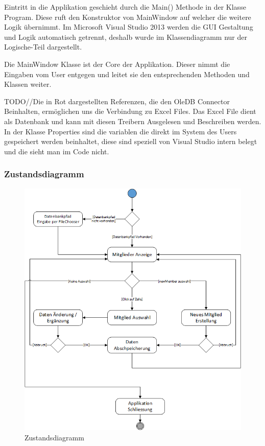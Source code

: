 \documentclass{article}
\begin{document}
Eintritt in die Applikation geschieht durch die Main() Methode in der Klasse Program. Diese ruft den Konstruktor von MainWindow auf welcher die weitere Logik übernimmt. Im Microsoft Visual Studio 2013 werden die GUI Gestaltung und Logik automatisch getrennt, deshalb wurde im Klassendiagramm nur der Logische-Teil dargestellt.

Die MainWindow Klasse ist der Core der Applikation. Dieser nimmt die Eingaben vom User entgegen und leitet sie den entsprechenden Methoden und Klassen weiter. 

TODO//Die in Rot dargestellten Referenzen, die den OleDB Connector Beinhalten, ermöglichen uns die Verbindung zu Excel Files. Das Excel File dient als Datenbank und kann mit diesen Treibern Ausgelesen und Beschreiben werden. In der Klasse Properties sind die variablen die direkt im System des Users gespeichert werden beinhaltet, diese sind speziell von Visual Studio intern belegt und die sieht man im Code nicht.

\newpage


\subsubsection{Zustandsdiagramm}
\begin{figure}[h]
	\centering
	\includegraphics[width=0.9 \textwidth]{Zustandsdiagramm}
	\caption{Zustandsdiagramm}
\end{figure}
\end{document}
